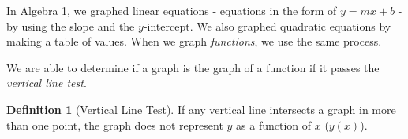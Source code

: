 \documentclass[addpoints,12pt]{exam}
\theoremstyle{definition}
\newtheorem{definition}{Definition}[subsection]
\begin{document}
\setcounter{section}{8}
\setcounter{subsection}{2}

In Algebra 1, we graphed linear equations - equations in the form of $y = mx + b$ - by using the slope and the $y$-intercept. We also graphed quadratic equations by making a table of values. When we graph \emph{functions}, we use the same process.

\vspace{.25in}

We are able to determine if a graph is the graph of a function if it passes the \emph{vertical line test}.

\vspace{.25in}
\begin{definition}[Vertical Line Test]
If any vertical line intersects a graph in more than one point, the graph does not represent $y$ as a function of $x$ ($y(x)$).
\end{definition}
\end{document}
